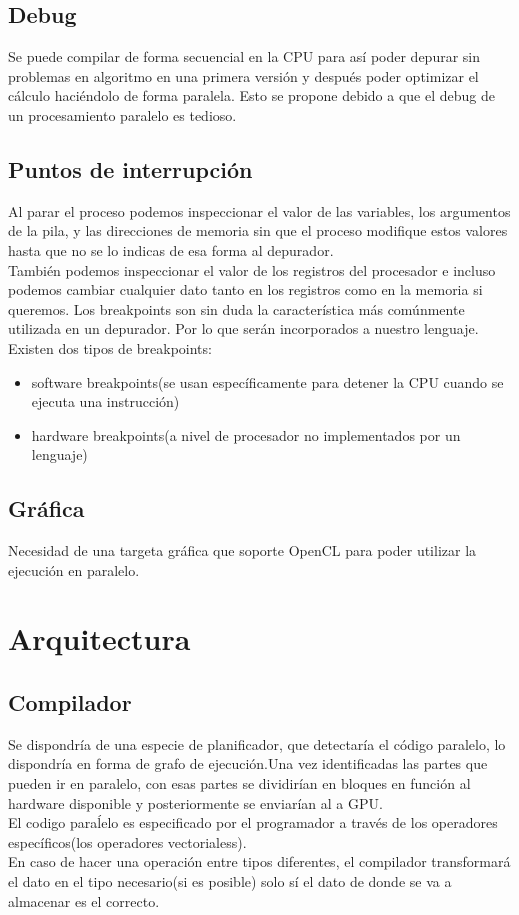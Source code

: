 \documentclass[12pt,a4paper]{article}
\begin{document}
\subsection{Debug}
Se puede compilar de forma secuencial en la CPU para así poder depurar sin
problemas en algoritmo en una primera versión y después poder optimizar el cálculo haciéndolo de forma paralela. Esto se propone debido a que el debug de un procesamiento paralelo es tedioso.
\subsection{Puntos de interrupción}
Al parar el proceso podemos inspeccionar el valor de las variables, los argumentos de la pila, y las direcciones de memoria sin que el proceso modifique estos valores hasta que no se lo indicas de esa forma al depurador.\\
También podemos inspeccionar el valor de los registros del procesador e incluso podemos cambiar cualquier dato tanto en los registros como en la memoria si queremos. Los breakpoints son sin duda la característica más comúnmente utilizada en un depurador. Por lo que serán incorporados a nuestro lenguaje.
\\ Existen dos tipos de breakpoints:
\begin{itemize}
\item software breakpoints(se usan específicamente para detener la CPU cuando se ejecuta una instrucción)
\item hardware breakpoints(a nivel de procesador no implementados por un lenguaje)
\end{itemize}
\subsection{Gráfica}
Necesidad de una targeta gráfica que soporte OpenCL para poder utilizar la
ejecución en paralelo.
\section{Arquitectura}
\subsection{Compilador}
Se dispondría de una especie de planificador, que detectaría el código paralelo,
lo dispondría en forma de grafo de ejecución.Una vez identificadas las partes
que pueden ir en paralelo, con esas partes se dividirían en bloques en función
al hardware disponible y posteriormente se enviarían al a GPU.\\
El codigo paraĺelo es especificado por el programador a través de los operadores
específicos(los operadores vectorialess).\\
En caso de hacer una operación entre tipos diferentes, el compilador
transformará el dato en el tipo necesario(si es posible) solo sí el dato de
donde se va a almacenar es el correcto.
\end{document}
